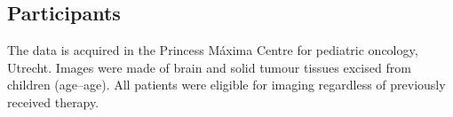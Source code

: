 \subsection{Participants}

The data is acquired in the Princess Máxima Centre for pediatric oncology, Utrecht.
Images were made of brain and solid tumour tissues excised from children (age--age).
All patients were eligible for imaging regardless of previously received therapy.

